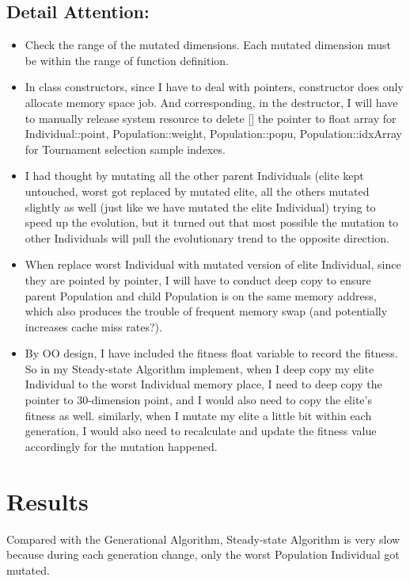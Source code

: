 \documentclass{article}
\begin{document}
\begin{CJK}{UTF8}{gbsn}
\subsection{Detail Attention: }
\begin{itemize}
  \itemsep=-3pt
\item Check the range of the mutated dimensions. Each mutated dimension must be within the range of function definition. 
\item In class constructors, since I have to deal with pointers, constructor does only allocate memory space job. And corresponding, in the destructor, I will have to manually release system resource to delete [] the pointer to float array for Individual::point, Population::weight, Population::popu, Population::idxArray for Tournament selection sample indexes. 
\item I had thought by mutating all the other parent Individuals (elite kept untouched, worst got replaced by mutated elite, all the others mutated slightly as well (just like we have mutated the elite Individual) trying to speed up the evolution, but it turned out that most possible the mutation to other Individuals will pull the evolutionary trend to the opposite direction. 
\item When replace worst Individual with mutated version of elite Individual, since they are pointed by pointer, I will have to conduct deep copy to ensure parent Population and child Population is on the same memory address, which also produces the trouble of frequent memory swap (and potentially increases cache miss rates?).  
\item By OO design, I have included the fitness float variable to record the fitness. So in my Steady-state Algorithm implement, when I deep copy my elite Individual to the worst Individual memory place, I need to deep copy the pointer to 30-dimension point, and I would also need to copy the elite's fitness as well. similarly, when I mutate my elite a little bit within each generation, I would also need to recalculate and update the fitness value accordingly for the mutation happened. 
\end{itemize}


\section{Results}
Compared with the Generational Algorithm, Steady-state Algorithm is very slow because during each generation change, only the worst Population Individual got mutated.


\end{CJK}
\end{document}
